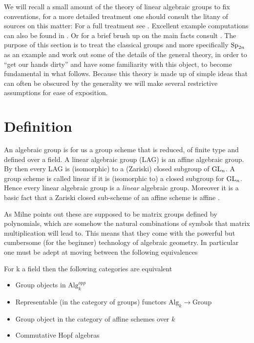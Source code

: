 We will recall a small amount of the theory of linear algebraic groups to fix conventions, for a more detailed treatment one should consult the litany of sources on this matter: For a full treatment see \cite{milneAlgebraicGroupsTheory2017}\cite{milneLieAlgebrasAlgebraic}\cite{milneBasicTheoryAffine}\cite{springerLinearAlgebraicGroups1998}. Excellent example computations can also be found in \cite{BuildingsClassicalGroups}\cite{makisumiStructureTheoryReductive}\cite{malleLinearAlgebraicGroups}\cite{NotesClassAlgebraic}. Or for a brief brush up on the main facts consult \cite[I.I.1]{borelAutomorphicFormsRepresentations1979}. The purpose of this section is to treat the classical groups and more specifically \(\operatorname{Sp}_{2n}\) as an example and work out some of the details of the general theory, in order to ``get our hands dirty'' and have some familiarity with this object, to become fundamental in what follows. Because this theory is made up of simple ideas that can often be obscured by the generality we will make several restrictive assumptions for ease of exposition. 

\section{Definition}
An algebraic group is for us a group scheme that is reduced, of finite type and defined over a field. A linear algebraic group (LAG) is an affine algebraic group.
By \cite[2.3.7(i)]{springerLinearAlgebraicGroups1998} then every LAG is (isomorphic) to a (Zariski) closed subgroup of \(\operatorname{GL}_n\). A group scheme is called linear if it is (isomorphic to) a closed subgroup for \(\operatorname{GL}_n\). Hence every linear algebraic group is a \textit{linear} algebraic group. Moreover it is a basic fact that a Zariski closed sub-scheme of an affine scheme is affine \cite[II.5.T3]{mumfordRedBookVarieties1999}.

As Milne points out \cite[Abstract]{milneAlgebraicGroupsTheory2017} these are supposed to be matrix groups defined by polynomials, which are somehow the natural combinations of symbols that matrix multiplication will lead to. This means that they come with the powerful but cumbersome (for the beginner) technology of algebraic geometry. In particular one must be adept at moving between the following equivalences
\begin{Theorem}
    For k a field then the following categories are equivalent
    \begin{itemize}
        \item Group objects in \(\mathrm{Alg}_k^{opp}\)
        \item Representable (in the category of groups) functors \(\mathrm{Alg}_k \to \mathrm{Group}\)
        \item Group object in the category of affine schemes over \(k\)
        \item Commutative Hopf algebras
    \end{itemize}
\end{Theorem}

